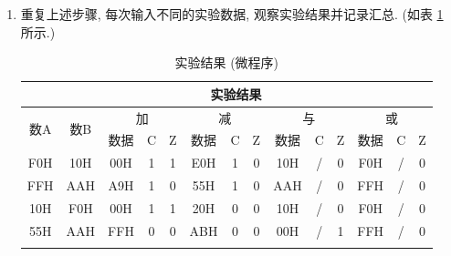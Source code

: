 \documentclass[../main.tex]{subfiles}
\begin{document}
\begin{enumerate}
    \item 重复上述步骤, 每次输入不同的实验数据, 观察实验结果并记录汇总. (如表 \ref{tab:1.1} 所示.)

          \begin{table}[htb]
              \centering
              \begin{tabular}{cc|cccccccccccc}
                  \Xhline{1pt}
                  \multicolumn{2}{c|}{实验数据} & \multicolumn{12}{c}{实验结果}                                                                                                                                                                                  \\ \hline
                  \multirow{2}{*}{数A}       & \multirow{2}{*}{数B}       & \multicolumn{3}{c|}{加} & \multicolumn{3}{c|}{减} & \multicolumn{3}{c|}{与} & \multicolumn{3}{c}{或}                                                                               \\
                                            &                           & 数据                     & C                      & \multicolumn{1}{c|}{Z} & 数据                    & C & \multicolumn{1}{c|}{Z} & 数据  & C & \multicolumn{1}{c|}{Z} & 数据  & C & Z \\ \hline
                  F0H                       & 10H                       & 00H                    & 1                      & \multicolumn{1}{c|}{1} & E0H                   & 1 & \multicolumn{1}{c|}{0} & 10H & / & \multicolumn{1}{c|}{0} & F0H & / & 0 \\
                  FFH                       & AAH                       & A9H                    & 1                      & \multicolumn{1}{c|}{0} & 55H                   & 1 & \multicolumn{1}{c|}{0} & AAH & / & \multicolumn{1}{c|}{0} & FFH & / & 0 \\
                  10H                       & F0H                       & 00H                    & 1                      & \multicolumn{1}{c|}{1} & 20H                   & 0 & \multicolumn{1}{c|}{0} & 10H & / & \multicolumn{1}{c|}{0} & F0H & / & 0 \\
                  55H                       & AAH                       & FFH                    & 0                      & \multicolumn{1}{c|}{0} & ABH                   & 0 & \multicolumn{1}{c|}{0} & 00H & / & \multicolumn{1}{c|}{1} & FFH & / & 0 \\
                  \Xhline{1pt}
              \end{tabular}
              \caption{实验结果 (微程序)}
              \label{tab:1.1}
          \end{table}

\end{enumerate}
\end{document}
